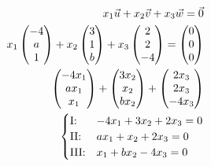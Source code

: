 \begin{align*}
    x_1 \vec{u}  + x_2 \vec{v} + x_3 \vec{w} = \vec{0} \\
    x_1 \begin{pmatrix}
        -4 \\ a \\ 1
    \end{pmatrix} + x_2 \begin{pmatrix}
        3 \\ 1 \\ b
    \end{pmatrix} + x_3 \begin{pmatrix}
        2 \\ 2 \\ -4
    \end{pmatrix} = \begin{pmatrix}
        0 \\ 0 \\0
    \end{pmatrix} \\
    \begin{pmatrix}
        -4x_1 \\ ax_1 \\ x_1
    \end{pmatrix} + \begin{pmatrix}
        3x_2 \\ x_2 \\ bx_2
    \end{pmatrix} + \begin{pmatrix}
        2x_3 \\ 2x_3 \\ -4x_3
    \end{pmatrix} \\
    \begin{cases}
        \text{I:\@} & -4x_1 + 3x_2 + 2x_3 = 0 \\
        \text{II:\@} & ax_1 + x_2 + 2x_3 = 0 \\
        \text{III:\@} & x_1 + bx_2 -4x_3 = 0
    \end{cases} \\
\end{align*}